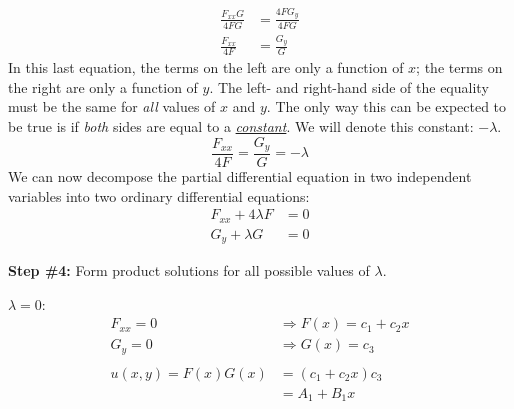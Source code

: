 \begin{align*}
\frac{F_{xx} G}{4FG} &= \frac{4FG_y}{4FG} \\
\frac{F_{xx}}{4F} &= \frac{G_y}{G}
\end{align*}
In this last equation, the terms on the left are only a function of $x$; the terms on the right are only a function of $y$.  The left- and right-hand side of the equality must be the same for \emph{all} values of $x$ and $y$.  The only way this can be expected to be true is if \emph{both} sides are equal to a \emph{\underline{constant}}.  We will denote this constant: $-\lambda$.
\begin{equation*}
\frac{F_{xx}}{4F} = \frac{G_y}{G} = -\lambda 
\end{equation*}
We can now decompose the partial differential equation in two independent variables into two ordinary differential equations:
\begin{align*}
F_{xx} + 4\lambda F &= 0 \\
G_y + \lambda G &= 0
\end{align*}

\vspace{0.5cm}

\noindent\textbf{Step \#4:} Form product solutions for all possible values of $\lambda$.

\vspace{0.25cm}

\noindent\underline{$\lambda = 0$}:
\begin{align*}
F_{xx} = 0 &\Rightarrow F(x) = c_1 + c_2x \\
G_y = 0 &\Rightarrow G(x) = c_3 \\
& \\
u(x,y) = F(x)G(x) &= \left(c_1 + c_2x\right) c_3 \\
 &= A_1 + B_1 x
\end{align*}

